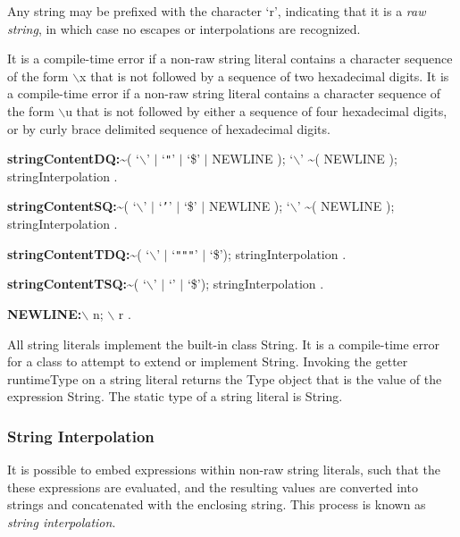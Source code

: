 \documentclass{article}
\newcommand{\code}[1]{{\sf #1}}
\begin{document}
\LMHash{}
Any string may be prefixed with the character `r', indicating that it is a {\em raw string}, in which case no escapes or interpolations are recognized.

\LMHash{}
It is a compile-time error if a non-raw string literal contains a character sequence of the form $\backslash$x that is not followed by a sequence of two hexadecimal digits. It is a compile-time error if a non-raw string literal  contains a character sequence of the form $\backslash$u that is not followed by either a sequence of four hexadecimal digits, or by curly brace delimited sequence of hexadecimal digits.



\begin{grammar}
 {\bf stringContentDQ:}\~{}( `$\backslash$' $|$ `{\escapegrammar \texttt{"}}' $|$ `\$' $|$ NEWLINE );
      `$\backslash$'  \~{}( NEWLINE );
     stringInterpolation
    .

 {\bf stringContentSQ:}\~{}( `$\backslash$' $|$ `{\escapegrammar \texttt{'}}' $|$ `\$' $|$ NEWLINE );
      `$\backslash$'  \~{}( NEWLINE );
     stringInterpolation
    .

    
 {\bf stringContentTDQ:}\~{}( `$\backslash$' $|$  `{\escapegrammar \texttt{"""}}' $|$ `\$');
     stringInterpolation
    .    

 {\bf stringContentTSQ:}\~{}( `$\backslash$' $|$ `{\escapegrammar \code{'}\code{'}\code{'}}' $|$ `\$');
     stringInterpolation
    .
    
{\bf NEWLINE:}$\backslash$ n;
      $\backslash$ r
    .

 \end{grammar}
 
\LMHash{}
All string literals implement the built-in class \code{String}. It is a compile-time error for a class to attempt to extend or implement \code{String}. Invoking the getter \code{runtimeType} on a string literal returns the \code{Type} object that is the value of the expression \code{String}. The static type of a string literal is \code{String}.

\subsubsection{String Interpolation}

\LMHash{}
It is possible to embed expressions within non-raw string literals, such that the these expressions are evaluated, and the resulting values are converted into strings and concatenated with the enclosing string. This process is known as {\em string interpolation}.
\end{document}
